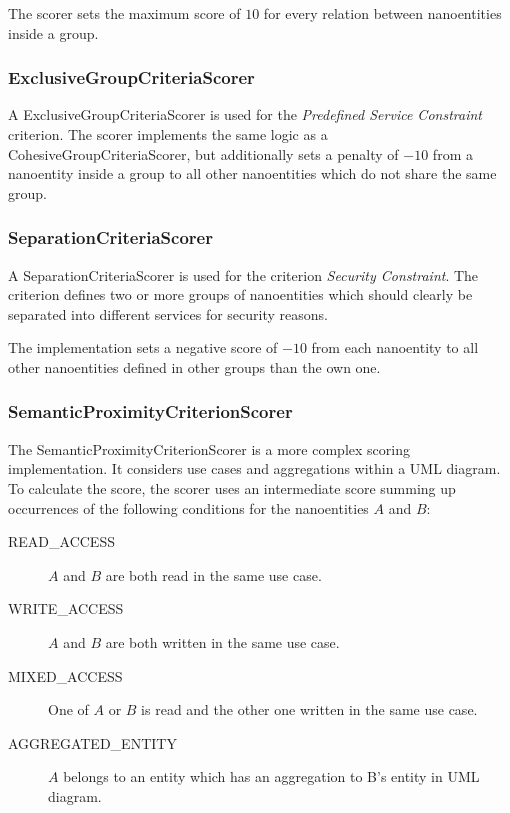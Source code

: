 The scorer sets the maximum score of $10$ for every relation between nanoentities inside a group. 

\subsubsection{ExclusiveGroupCriteriaScorer}

A ExclusiveGroupCriteriaScorer is used for the \textit{Predefined Service Constraint} criterion. The scorer implements the same logic as a CohesiveGroupCriteriaScorer, but additionally sets a penalty of $-10$ from a nanoentity inside a group to all other nanoentities which do not share the same group.

\subsubsection{SeparationCriteriaScorer}

A SeparationCriteriaScorer is used for the criterion \textit{Security Constraint}. The criterion defines two or more groups of nanoentities which should clearly be separated into different services for security reasons. 

The implementation sets a negative score of $-10$ from each nanoentity to all other nanoentities defined in other groups than the own one. 

\subsubsection{SemanticProximityCriterionScorer}

The SemanticProximityCriterionScorer is a more complex scoring implementation. It considers use cases and aggregations within a UML diagram. To calculate the score, the scorer uses an intermediate score summing up occurrences of the following conditions for the nanoentities $A$ and $B$:

\begin{description}
	\item [READ\_ACCESS] $A$ and $B$ are both read in the same use case.
	\item [WRITE\_ACCESS] $A$ and $B$ are both written in the same use case.
	\item [MIXED\_ACCESS] One of $A$ or $B$ is read and the other one written in the same use case.
	\item [AGGREGATED\_ENTITY] $A$ belongs to an entity which has an aggregation to B's entity in UML diagram. 
\end{description}

